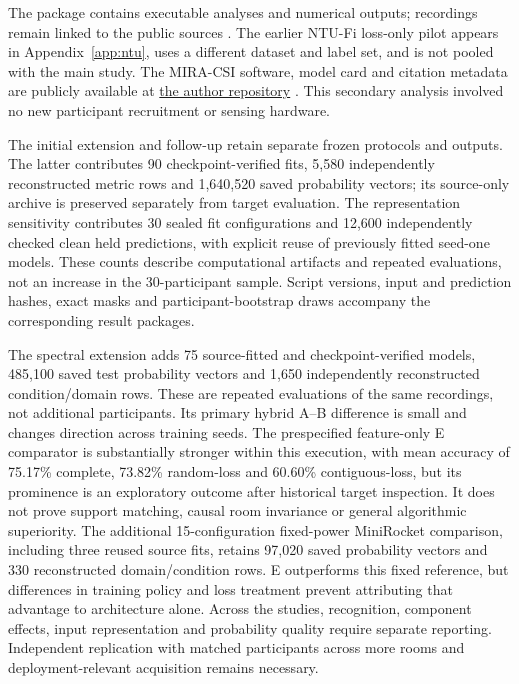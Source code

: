 \documentclass[a4paper,11pt,fleqn]{mira-author}
\begin{document}
The package contains executable analyses and numerical outputs; recordings remain linked to the public sources \cite{alsaify2020,multienvdata}. The earlier NTU-Fi loss-only pilot appears in Appendix~\ref{app:ntu}, uses a different dataset and label set, and is not pooled with the main study. The MIRA-CSI software, model card and citation metadata are publicly available at \href{https://github.com/ABDESSAMAD-BOURKIBATE/mira-csi}{the author repository} \cite{bourkibate2026mira}. This secondary analysis involved no new participant recruitment or sensing hardware.

The initial extension and follow-up retain separate frozen protocols and outputs. The latter contributes 90 checkpoint-verified fits, 5,580 independently reconstructed metric rows and 1,640,520 saved probability vectors; its source-only archive is preserved separately from target evaluation. The representation sensitivity contributes 30 sealed fit configurations and 12,600 independently checked clean held predictions, with explicit reuse of previously fitted seed-one models. These counts describe computational artifacts and repeated evaluations, not an increase in the 30-participant sample. Script versions, input and prediction hashes, exact masks and participant-bootstrap draws accompany the corresponding result packages.

The spectral extension adds 75 source-fitted and checkpoint-verified models, 485,100 saved test probability vectors and 1,650 independently reconstructed condition/domain rows. These are repeated evaluations of the same recordings, not additional participants. Its primary hybrid A--B difference is small and changes direction across training seeds. The prespecified feature-only E comparator is substantially stronger within this execution, with mean accuracy of 75.17\% complete, 73.82\% random-loss and 60.60\% contiguous-loss, but its prominence is an exploratory outcome after historical target inspection. It does not prove support matching, causal room invariance or general algorithmic superiority. The additional 15-configuration fixed-power MiniRocket comparison, including three reused source fits, retains 97,020 saved probability vectors and 330 reconstructed domain/condition rows. E outperforms this fixed reference, but differences in training policy and loss treatment prevent attributing that advantage to architecture alone. Across the studies, recognition, component effects, input representation and probability quality require separate reporting. Independent replication with matched participants across more rooms and deployment-relevant acquisition remains necessary.
\end{document}
